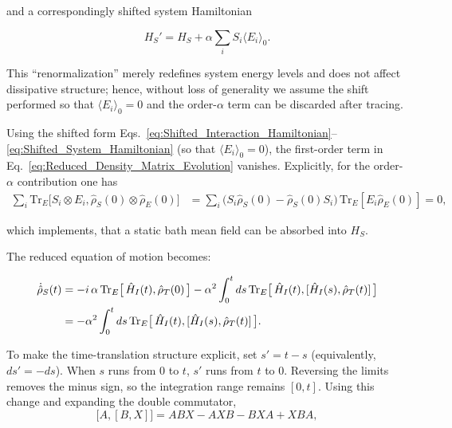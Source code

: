 \noindent
and a correspondingly shifted system Hamiltonian

\begin{equation}
	H_S' = H_S + \alpha \sum_i S_i \langle E_i \rangle_0.
	\label{eq:Shifted_System_Hamiltonian}
\end{equation}

\noindent
This ``renormalization'' merely redefines system energy levels and does not affect dissipative structure; hence, without loss of generality we assume the shift performed so that $\langle E_i \rangle_0 = 0$ and the order-$\alpha$ term can be discarded after tracing.

\noindent
Using the shifted form Eqs.~\eqref{eq:Shifted_Interaction_Hamiltonian}--\eqref{eq:Shifted_System_Hamiltonian} (so that $\langle E_i \rangle_0 = 0$), the first-order term in Eq.~\eqref{eq:Reduced_Density_Matrix_Evolution} vanishes. Explicitly, for the order-$\alpha$ contribution one has
\begin{align}
	\sum_i \mathrm{Tr}_E\big[ S_i \otimes E_i, \hat{\rho}_S(0) \otimes \hat{\rho}_E(0)\big]
	 & = \sum_i \big(S_i \hat{\rho}_S(0) - \hat{\rho}_S(0) S_i\big) \, \mathrm{Tr}_E[E_i \hat{\rho}_E(0)] = 0,
	\label{eq:Trace_Relation_first_part}
\end{align}

\noindent
which implements, that a static bath mean field can be absorbed into $H_S$.

\noindent
The reduced equation of motion becomes:

\begin{align}
	\dot{\hat{\rho}}_S(t) & = -i \, \alpha \, \mathrm{Tr}_E\big[\,\hat{H}_I(t),\hat{\rho}_T(0)\,\big]
	- \alpha^2 \int_0^t ds\, \mathrm{Tr}_E \big[\,\hat{H}_I(t), [\hat{H}_I(s), \hat{\rho}_T(t)] \,\big] \notag                     \\
	                      & = - \alpha^2 \int_0^t ds\, \mathrm{Tr}_E \big[\,\hat{H}_I(t), [\hat{H}_I(s), \hat{\rho}_T(t)] \,\big].
	\label{eq:Partial_Trace_Derivation}
\end{align}

\noindent
To make the time-translation structure explicit, set $s' = t-s$ (equivalently, $ds' = -ds$). When $s$ runs from $0$ to $t$, $s'$ runs from $t$ to $0$. Reversing the limits removes the minus sign, so the integration range remains $[0,t]$. Using this change and expanding the double commutator,
\begin{equation}
	\label{eq:double_comm_expansion_rule}
	\big[ A, [B, X] \big] = A B X - A X B - B X A + X B A,
\end{equation}

